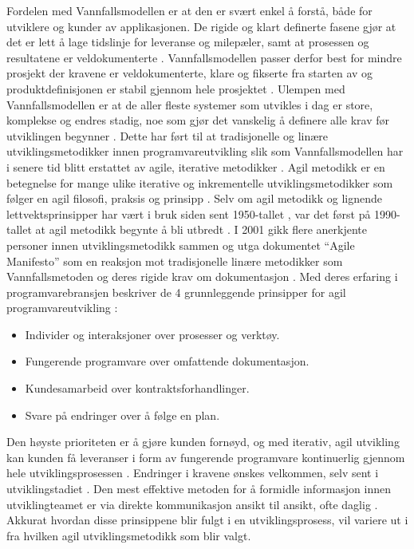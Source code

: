 Fordelen med Vannfallsmodellen er at den er svært enkel å forstå, både for utviklere og kunder av applikasjonen. De rigide og klart definerte fasene gjør at det er lett å lage tidslinje for leveranse og milepæler, samt at prosessen og resultatene er veldokumenterte \cite{SDLCWaterfallModel}. Vannfallsmodellen passer derfor best for mindre prosjekt der kravene er veldokumenterte, klare og fikserte fra starten av og produktdefinisjonen er stabil gjennom hele prosjektet \cite{SDLCWaterfallModel}. Ulempen med Vannfallsmodellen er at de aller fleste systemer som utvikles i dag er store, komplekse og endres stadig, noe som gjør det vanskelig å definere alle krav før utviklingen begynner \cite{SDLCWaterfallModel}. Dette har ført til at tradisjonelle og linære utviklingsmetodikker innen programvareutvikling slik som Vannfallsmodellen har i senere tid blitt erstattet av agile, iterative metodikker \cite{livermoreFactorsThatImpact2007}. 
\newline
\newline
Agil metodikk er en betegnelse for mange ulike iterative og inkrementelle utviklingsmetodikker som følger en agil filosofi, praksis og prinsipp \cite[~s.20]{rannikkoUserCenteredDesignAgile2011}. Selv om agil metodikk og lignende lettvektsprinsipper har vært i bruk siden sent 1950-tallet \cite[~s.80]{larmanAgileIterativeDevelopment2004}, var det først på 1990-tallet at agil metodikk begynte å bli utbredt \cite[~s.87]{larmanAgileIterativeDevelopment2004}. I 2001 gikk flere anerkjente personer innen utviklingsmetodikk sammen og utga dokumentet \enquote{Agile Manifesto} \cite{beckManifestoAgileSoftware2001} som en reaksjon mot tradisjonelle linære metodikker som Vannfallsmetoden og deres rigide krav om dokumentasjon \cite{livermoreFactorsThatImpact2007}. Med deres erfaring i programvarebransjen beskriver de 4 grunnleggende prinsipper for agil programvareutvikling \cite{beckManifestoAgileSoftware2001}: 
\begin{itemize}
    \item Individer og interaksjoner over prosesser og verktøy.
    \item Fungerende programvare over omfattende dokumentasjon.
    \item Kundesamarbeid over kontraktsforhandlinger.
    \item Svare på endringer over å følge en plan. 
\end{itemize}
Den høyste prioriteten er å gjøre kunden fornøyd, og med iterativ, agil utvikling kan kunden få leveranser i form av fungerende programvare kontinuerlig gjennom hele utviklingsprosessen \cite{beckPrinciplesAgileManifesto2001}.  Endringer i kravene ønskes velkommen, selv sent i utviklingstadiet \cite{beckPrinciplesAgileManifesto2001}. Den mest effektive metoden for å formidle informasjon innen utviklingteamet er via direkte kommunikasjon ansikt til ansikt, ofte daglig \cite{beckPrinciplesAgileManifesto2001}. Akkurat hvordan disse prinsippene blir fulgt i en utviklingsprosess, vil variere ut i fra hvilken agil utviklingsmetodikk som blir valgt.

